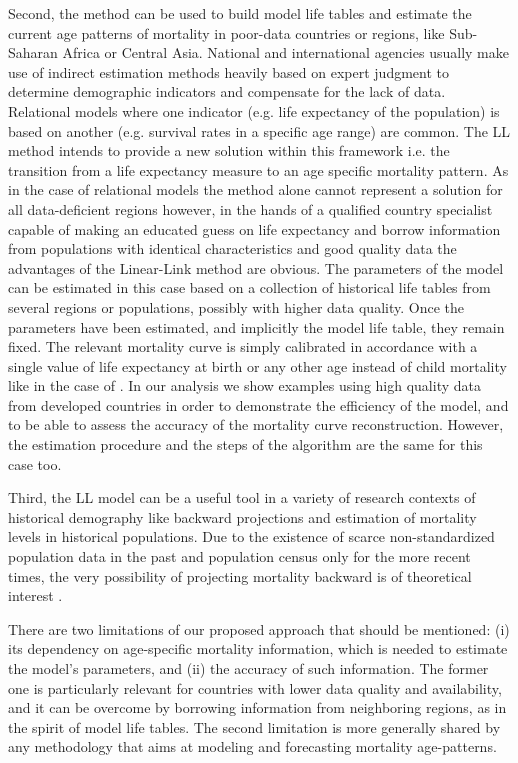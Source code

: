 \documentclass[risks,article,submit,moreauthors,pdftex]{Definitions/mdpi}
\begin{document}
Second, the method can be used to build model life tables and estimate the current age patterns of mortality in poor-data countries or regions, like Sub-Saharan Africa or Central Asia. National and international agencies usually make use of indirect estimation methods heavily based on expert judgment to determine demographic indicators and compensate for the lack of data. Relational models where one indicator (e.g. life expectancy of the population) is based on another (e.g. survival rates in a specific age range) are common. The LL method intends to provide a new solution within this framework i.e. the transition from a life expectancy measure to an age specific mortality pattern. As in the case of relational models the method alone cannot represent a solution for all data-deficient regions however, in the hands of a qualified country specialist capable of making an educated guess on life expectancy and borrow information from populations with identical characteristics and good quality data the advantages of the Linear-Link method are obvious. The parameters of the model can be estimated in this case based on a collection of historical life tables from several regions or populations, possibly with higher data quality. Once the parameters have been estimated, and implicitly the model life table, they remain fixed. The relevant mortality curve is simply calibrated in accordance with a single value of life expectancy at birth or any other age instead of child mortality like in the case of \cite{wilmoth2012}. In our analysis we show examples using high quality data from developed countries in order to demonstrate the efficiency of the model, and to be able to assess the accuracy of the mortality curve reconstruction. However, the estimation procedure and the steps of the algorithm are the same for this case too.

Third, the LL model can be a useful tool in a variety of research contexts of historical demography like backward projections and estimation of mortality levels in historical populations. Due to the existence of scarce non-standardized population data in the past and population census only for the more recent times, the very possibility of projecting mortality backward is of theoretical interest \citep{ediev2011}.

There are two limitations of our proposed approach that should be mentioned: (i) its dependency on age-specific mortality information, which is needed to estimate the model's parameters, and (ii) the accuracy of such information. The former one is particularly relevant for countries with lower data quality and availability, and it can be overcome by borrowing information from neighboring regions, as in the spirit of model life tables. The second limitation is more generally shared by any methodology that aims at modeling and forecasting mortality age-patterns.
\end{document}
